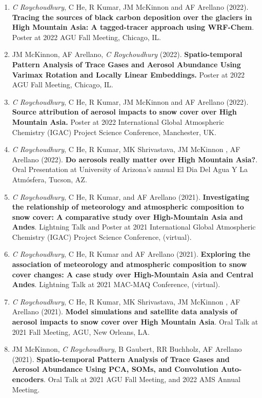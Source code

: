 \documentclass[margin,line]{resume}
\begin{document}
\begin{resume}
\begin{enumerate}[topsep=1pt, partopsep=1pt, itemsep=0.5pt, parsep=0.1pt, leftmargin=15pt,label=\arabic*.]
			\item \textit{C Roychoudhury}, C He, R Kumar, JM McKinnon and AF Arellano (2022).
			\textbf{Tracing the sources of black carbon deposition over the glaciers in High Mountain Asia: A tagged-tracer approach using WRF-Chem}. Poster at 2022 AGU Fall Meeting, Chicago, IL.
			
			\item JM McKinnon, AF Arellano, \textit{C Roychoudhury} (2022). \textbf{Spatio-temporal Pattern Analysis of Trace Gases and Aerosol Abundance Using Varimax Rotation and Locally Linear Embeddings.} Poster at 2022 AGU Fall Meeting, Chicago, IL.
			
			\item \textit{C Roychoudhury}, C He, R Kumar, JM McKinnon and AF Arellano (2022). 
			\textbf{Source attribution of aerosol impacts to snow cover over High Mountain Asia.} Poster at 2022 International Global Atmospheric Chemistry (IGAC) Project Science Conference, Manchester, UK.
			
			\item \textit{C Roychoudhury}, C He, R Kumar, MK Shrivastava, JM McKinnon , AF Arellano (2022).
			\textbf{Do aerosols really matter over High Mountain Asia?}.
			Oral Presentation at University of Arizona's annual El Dia Del Agua Y La Atmósfera, Tucson, AZ.
			
			\item \textit{C Roychoudhury}, C He, R Kumar, and AF Arellano (2021).
			\textbf{Investigating the relationship of meteorology and atmospheric composition to snow cover: A comparative study over High-Mountain Asia and Andes}.
			Lightning Talk and Poster at 2021 International Global Atmospheric Chemistry (IGAC) Project Science Conference, (virtual).
			
			\item \textit{C Roychoudhury}, C He, R Kumar and AF Arellano (2021).
			\textbf{Exploring the association of meteorology and atmospheric composition to snow cover changes: A case study over High-Mountain Asia and Central Andes}. 
			Lightning Talk at 2021 MAC-MAQ Conference, (virtual).
			
			\item \textit{C Roychoudhury}, C He, R Kumar, MK Shrivastava, JM McKinnon , AF Arellano (2021). 
			\textbf{Model simulations and satellite data analysis of aerosol impacts to snow cover over High Mountain Asia}. 
			Oral Talk at 2021 Fall Meeting, AGU, New Orleans, LA.
			
			\item JM McKinnon, \textit{C Roychoudhury}, B Gaubert, RR Buchholz, AF Arellano (2021).
			\textbf{Spatio-temporal Pattern Analysis of Trace Gases and Aerosol Abundance Using PCA, SOMs, and Convolution Auto-encoders}.
			Oral Talk at 2021 AGU Fall Meeting, and 2022 AMS Annual Meeting.
			

\end{enumerate}
\end{resume}
\end{document}
